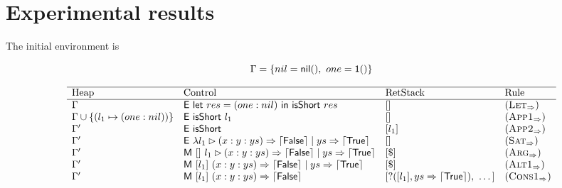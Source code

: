 \section{Experimental results}\label{sec:experimental}

The initial environment is

\[
    \Gamma = \{ nil = \textsf{nil}(),\ one = \textsf{1}() \}
\]

\newcommand{\retTrue}{\matchreturn{\textsf{True}}}
\newcommand{\retFalse}{\matchreturn{\textsf{False}}}
\newcommand{\isShortBody}{\matchalt{\matchpat{(x : y : ys)}{\retFalse}}{\matchpat{ys}{\retTrue}}}
\newcommand{\isShortPMC}{\ensuremath{\abstr{\isShortBody}}}
\newcommand{\isShort}{\textsf{isShort}}
\newcommand{\listOne}{(one : nil)}

\begin{figure*}
    \[
        \begin{array}{llll}
            \hline
            \text{Heap} & \text{Control}                                    & \text{RetStack}                                              & \text{Rule}            \\
            \hline
            \Gamma      & \eval{\llet{res = \listOne}{\app{\isShort}{res}}} & []                                                           & (\smallrule{Let})      \\
            \Gamma \cup \{(l_1\mapsto\listOne)\}
                        & \eval{\app{\isShort}{l_1}}                        & []                                                           & (\smallrule{App1})     \\
            \Gamma'     & \eval{\isShort}                                   & [l_1]                                                        & (\smallrule{App2})     \\
            \Gamma'     & \eval{\abstr{\matcharg{l_1}{\isShortBody}}}       & []                                                           & (\smallrule{Sat})      \\
            \Gamma'     & \match{[]}{\matcharg{l_1}{\isShortBody}}          & [\$]                                                         & (\smallrule{Arg})      \\
            \Gamma'     & \match{[l_1]}{\isShortBody}                       & [\$]                                                         & (\smallrule{Alt1})     \\
            \Gamma'     & \match{[l_1]}{\matchpat{(x : y : ys)}{\retFalse}} & [?([l_1],\matchpat{ys}{\matchreturn{\textsf{True}}}),~\dots] & (\smallrule{Cons1})    \\

\end{array}\]
\end{figure*}
